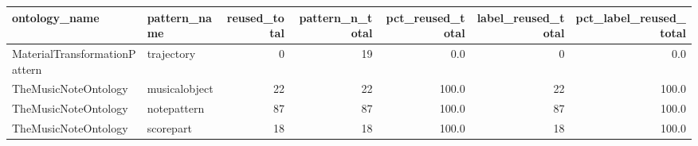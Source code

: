 \begin{tabular}{llrrrrr}
\toprule
ontology_name & pattern_name & reused_total & pattern_n_total & pct_reused_total & label_reused_total & pct_label_reused_total \\
\midrule
MaterialTransformationPattern & trajectory & 0 & 19 & 0.0 & 0 & 0.0 \\
TheMusicNoteOntology & musicalobject & 22 & 22 & 100.0 & 22 & 100.0 \\
TheMusicNoteOntology & notepattern & 87 & 87 & 100.0 & 87 & 100.0 \\
TheMusicNoteOntology & scorepart & 18 & 18 & 100.0 & 18 & 100.0 \\
\bottomrule
\end{tabular}
